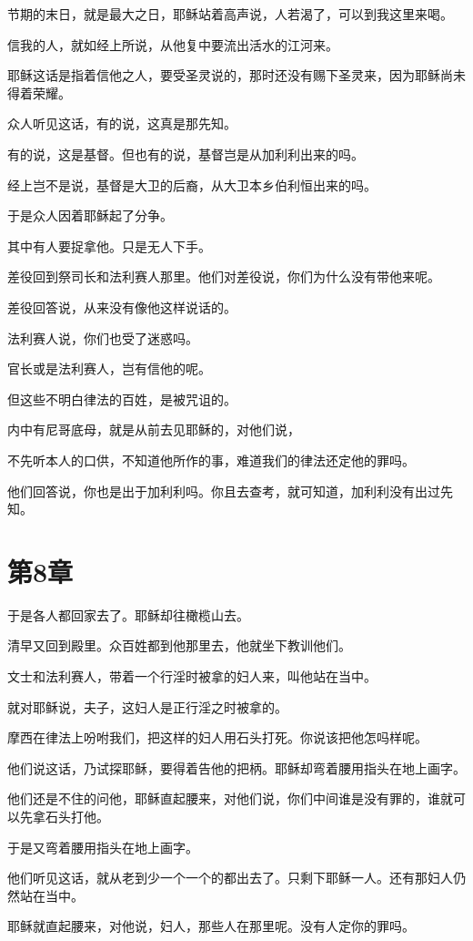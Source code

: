 \documentclass[12pt,oneside]{book}
\begin{document}
节期的末日，就是最大之日，耶稣站着高声说，人若渴了，可以到我这里来喝。

信我的人，就如经上所说，从他复中要流出活水的江河来。

耶稣这话是指着信他之人，要受圣灵说的，那时还没有赐下圣灵来，因为耶稣尚未得着荣耀。

众人听见这话，有的说，这真是那先知。

有的说，这是基督。但也有的说，基督岂是从加利利出来的吗。

经上岂不是说，基督是大卫的后裔，从大卫本乡伯利恒出来的吗。

于是众人因着耶稣起了分争。

其中有人要捉拿他。只是无人下手。

差役回到祭司长和法利赛人那里。他们对差役说，你们为什么没有带他来呢。

差役回答说，从来没有像他这样说话的。

法利赛人说，你们也受了迷惑吗。

官长或是法利赛人，岂有信他的呢。

但这些不明白律法的百姓，是被咒诅的。

内中有尼哥底母，就是从前去见耶稣的，对他们说，

不先听本人的口供，不知道他所作的事，难道我们的律法还定他的罪吗。

他们回答说，你也是出于加利利吗。你且去查考，就可知道，加利利没有出过先知。

\chapter{第8章}
于是各人都回家去了。耶稣却往橄榄山去。

清早又回到殿里。众百姓都到他那里去，他就坐下教训他们。

文士和法利赛人，带着一个行淫时被拿的妇人来，叫他站在当中。

就对耶稣说，夫子，这妇人是正行淫之时被拿的。

摩西在律法上吩咐我们，把这样的妇人用石头打死。你说该把他怎吗样呢。

他们说这话，乃试探耶稣，要得着告他的把柄。耶稣却弯着腰用指头在地上画字。

他们还是不住的问他，耶稣直起腰来，对他们说，你们中间谁是没有罪的，谁就可以先拿石头打他。

于是又弯着腰用指头在地上画字。

他们听见这话，就从老到少一个一个的都出去了。只剩下耶稣一人。还有那妇人仍然站在当中。

耶稣就直起腰来，对他说，妇人，那些人在那里呢。没有人定你的罪吗。
\end{document}
